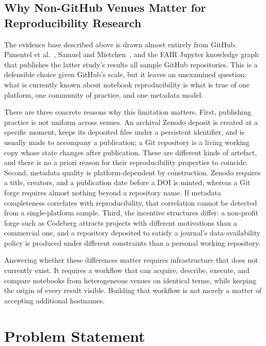 \subsection*{Why Non-GitHub Venues Matter for Reproducibility Research}

The evidence base described above is drawn almost entirely from GitHub. Pimentel et al.~\cite{pimentel2019}, Samuel and Mietchen~\cite{samuel2024computational}, and the FAIR Jupyter knowledge graph~\cite{samuel2024fairjupyter} that publishes the latter study's results all sample GitHub repositories. This is a defensible choice given GitHub's scale, but it leaves an unexamined question: what is currently known about notebook reproducibility is what is true of one platform, one community of practice, and one metadata model.

There are three concrete reasons why this limitation matters. First, publishing practice is not uniform across venues. An archival Zenodo deposit is created at a specific moment, keeps its deposited files under a persistent identifier, and is usually made to accompany a publication; a Git repository is a living working copy whose state changes after publication. These are different kinds of artefact, and there is no a priori reason for their reproducibility properties to coincide. Second, metadata quality is platform-dependent by construction. Zenodo requires a title, creators, and a publication date before a DOI is minted, whereas a Git forge requires almost nothing beyond a repository name. If metadata completeness correlates with reproducibility, that correlation cannot be detected from a single-platform sample. Third, the incentive structures differ: a non-profit forge such as Codeberg attracts projects with different motivations than a commercial one, and a repository deposited to satisfy a journal's data-availability policy is produced under different constraints than a personal working repository.

Answering whether these differences matter requires infrastructure that does not currently exist. It requires a workflow that can acquire, describe, execute, and compare notebooks from heterogeneous venues on identical terms, while keeping the origin of every result visible. Building that workflow is not merely a matter of accepting additional hostnames.

\section{Problem Statement}
\label{sec:problem-statement}

